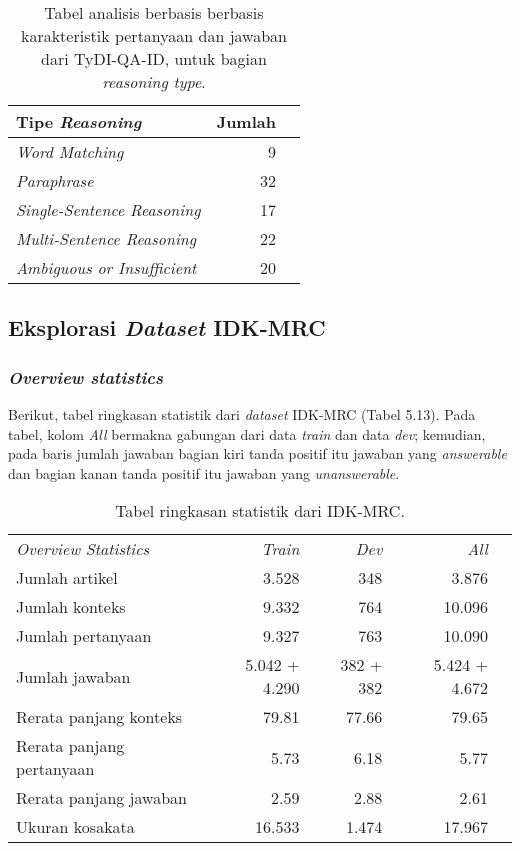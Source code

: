\begin{table}[H]\centering
\begin{tabular}{lrr}\toprule
Tipe \emph{Reasoning} &Jumlah \\\midrule
\emph{Word Matching} & 9\\
\emph{Paraphrase} & 32\\
\emph{Single-Sentence Reasoning} & 17\\
\emph{Multi-Sentence Reasoning} & 22\\
\emph{Ambiguous or Insufficient} & 20\\
\bottomrule
\end{tabular}
\caption{Tabel analisis berbasis berbasis karakteristik pertanyaan dan jawaban dari TyDI-QA-ID, untuk bagian \emph{reasoning type}.}
\end{table}

\subsection{Eksplorasi \emph{Dataset} IDK-MRC}

\subsubsection{\emph{Overview statistics}}
Berikut, tabel ringkasan statistik dari \emph{dataset} IDK-MRC (Tabel 5.13). Pada tabel, kolom \emph{All} bermakna gabungan dari data \emph{train} dan data \emph{dev}; kemudian, pada baris jumlah jawaban bagian kiri tanda positif itu jawaban yang \emph{answerable} dan bagian kanan tanda positif itu jawaban yang \emph{unanswerable}.

\begin{table}[H]\centering
\begin{tabular}{lrrrr}\toprule
\emph{Overview Statistics} &\emph{Train} &\emph{Dev} &\emph{All} \\
Jumlah artikel &3.528 &348 &3.876 \\
Jumlah konteks &9.332 &764 &10.096 \\
Jumlah pertanyaan &9.327 &763 &10.090 \\
Jumlah jawaban &5.042 + 4.290 &382 + 382 &5.424 + 4.672 \\
Rerata panjang konteks &79.81 &77.66 &79.65 \\
Rerata panjang pertanyaan &5.73 &6.18 &5.77 \\
Rerata panjang jawaban &2.59 &2.88 &2.61 \\
Ukuran kosakata &16.533 &1.474 &17.967 \\
\bottomrule
\end{tabular}
\caption{Tabel ringkasan statistik dari IDK-MRC.}
\end{table}

